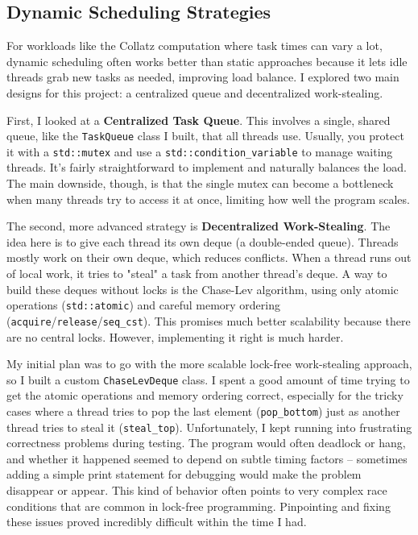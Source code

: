 \documentclass[10pt]{article}
\newcommand{\code}[1]{\texttt{#1}} %
\begin{document}
\subsection{Dynamic Scheduling Strategies}
For workloads like the Collatz computation where task times can vary a lot, dynamic scheduling often works better than static approaches because it lets idle threads grab new tasks as needed, improving load balance. I explored two main designs for this project: a centralized queue and decentralized work-stealing.

First, I looked at a \textbf{Centralized Task Queue}. This involves a single, shared queue, like the \code{TaskQueue} class I built, that all threads use. Usually, you protect it with a \code{std::mutex} and use a \code{std::condition\_variable} to manage waiting threads. It's fairly straightforward to implement and naturally balances the load. The main downside, though, is that the single mutex can become a bottleneck when many threads try to access it at once, limiting how well the program scales.

The second, more advanced strategy is \textbf{Decentralized Work-Stealing}. The idea here is to give each thread its own deque (a double-ended queue). Threads mostly work on their own deque, which reduces conflicts. When a thread runs out of local work, it tries to "steal" a task from another thread's deque. A way to build these deques without locks is the Chase-Lev algorithm, using only atomic operations (\code{std::atomic}) and careful memory ordering (\code{acquire}/\code{release}/\code{seq\_cst}). This promises much better scalability because there are no central locks. However, implementing it right is much harder.

My initial plan was to go with the more scalable lock-free work-stealing approach, so I built a custom \code{ChaseLevDeque} class. I spent a good amount of time trying to get the atomic operations and memory ordering correct, especially for the tricky cases where a thread tries to pop the last element (\code{pop\_bottom}) just as another thread tries to steal it (\code{steal\_top}). Unfortunately, I kept running into frustrating correctness problems during testing. The program would often deadlock or hang, and whether it happened seemed to depend on subtle timing factors – sometimes adding a simple print statement for debugging would make the problem disappear or appear. This kind of behavior often points to very complex race conditions that are common in lock-free programming. Pinpointing and fixing these issues proved incredibly difficult within the time I had.
\end{document}
